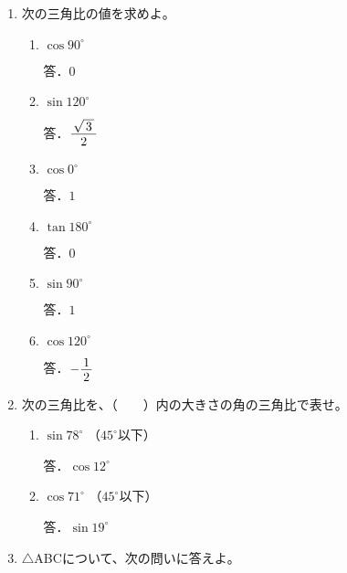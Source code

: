 \documentclass[b4paper,twocolumn]{jsarticle}
\def\nfrac#1#2{%
\displaystyle \frac{\lower.44ex\hbox{$\,#1\,$}}{\lower-.1ex\hbox{$\,#2\,$}}}%
\begin{document}
\newpage


\begin{enumerate}
\item 次の三角比の値を求めよ。

\begin{enumerate}
\item $\cos 90^\circ $
\vfill

\hfill 答．$0$

\item $\sin 120^\circ $
\vfill

\hfill 答．$\nfrac{\sqrt{\,3\,}}{2}$

\item $\cos 0^\circ $
\vfill

\hfill 答．$1$

\item $\tan 180^\circ $
\vfill

\hfill 答．$0$

\item $\sin 90^\circ $
\vfill

\hfill 答．$1$

\item $\cos 120^\circ $
\vfill

\hfill 答．$-\nfrac{1}{2}$

\end{enumerate}

\item 次の三角比を、（　　）内の大きさの角の三角比で表せ。

\begin{enumerate}
\item $\sin 78^\circ$ \hfill （$45^\circ$以下） \hspace{30truemm}
\vfill

\hfill 答．$\cos 12^\circ$

\item $\cos 71^\circ$ \hfill （$45^\circ$以下） \hspace{30truemm}
\vfill

\hfill 答．$\sin 19^\circ$

\end{enumerate}

\newpage
\item $\triangle$ABCについて、次の問いに答えよ。


\end{enumerate}
\end{document}
